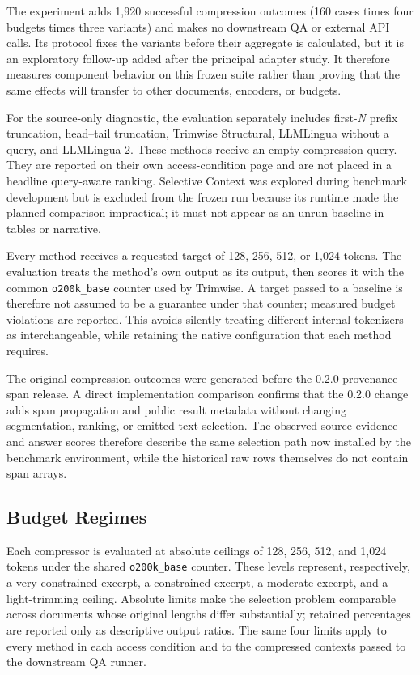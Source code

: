 \documentclass[
]{article}
\begin{document}
The experiment adds 1,920 successful compression outcomes (160 cases times
four budgets times three variants) and makes no downstream QA or external API
calls. Its protocol fixes the variants before their aggregate is calculated,
but it is an exploratory follow-up added after the principal adapter study. It
therefore measures component behavior on this frozen suite rather than proving
that the same effects will transfer to other documents, encoders, or budgets.

For the source-only diagnostic, the evaluation separately includes
first-\emph{N} prefix truncation, head--tail truncation, Trimwise
Structural, LLMLingua without a query, and LLMLingua-2. These methods
receive an empty compression query. They are reported on their own
access-condition page and are not placed in a headline query-aware
ranking. Selective Context was explored during benchmark development but
is excluded from the frozen run because its runtime made the planned
comparison impractical; it must not appear as an unrun baseline in
tables or narrative.

Every method receives a requested target of 128, 256, 512, or 1,024
tokens. The evaluation treats the method's own output as its output, then
scores it with the common \texttt{o200k\_base} counter used by Trimwise.
A target passed to a baseline is therefore not assumed to be a guarantee
under that counter; measured budget violations are reported. This avoids
silently treating different internal tokenizers as interchangeable,
while retaining the native configuration that each method requires.

The original compression outcomes were generated before the 0.2.0
provenance-span release. A direct implementation comparison confirms
that the 0.2.0 change adds span propagation and public result metadata
without changing segmentation, ranking, or emitted-text selection. The
observed source-evidence and answer scores therefore describe the same
selection path now installed by the benchmark environment, while the
historical raw rows themselves do not contain span arrays.

\subsection{Budget Regimes}\label{budget-regimes}

Each compressor is evaluated at absolute ceilings of 128, 256, 512, and
1,024 tokens under the shared \texttt{o200k\_base} counter. These levels
represent, respectively, a very constrained excerpt, a constrained
excerpt, a moderate excerpt, and a light-trimming ceiling. Absolute
limits make the selection problem comparable across documents whose
original lengths differ substantially; retained percentages are reported
only as descriptive output ratios. The same four limits apply to every
method in each access condition and to the compressed contexts passed to
the downstream QA runner.
\end{document}
